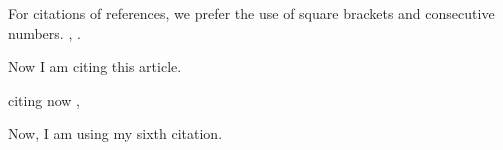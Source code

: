 \documentclass[runningheads]{llncs}
\begin{document}
For citations of references, we prefer the use of square brackets
and consecutive numbers. \cite{bariah2020prospective}, \cite{kato2020ten}.

Now I am citing this article. \cite{hoehle2015mobile}

citing now \cite{8766917}, \cite{10.5555/2667432.2667458}

Now, I am using my sixth \cite{mao2017survey} citation.

\cite{910896}

\cite{*}

%
%
%




%
\end{document}

